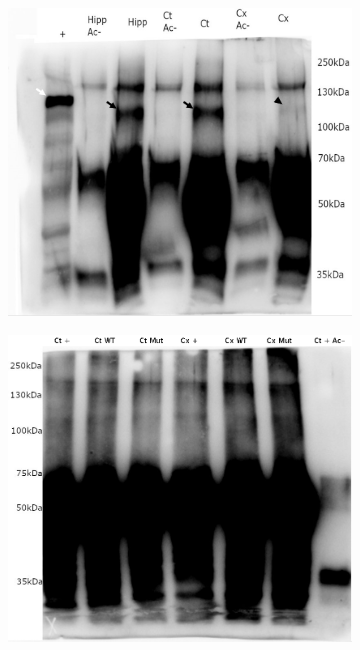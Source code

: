 	\begin{figure}[h]
		\begin{center}
			\begin{subfigure}[h]{0.49\textwidth}
				\caption{}
				\label{fig:WBbon}
				\includegraphics[width=\textwidth]{./Images/WB/2018-04-09.jpg}
			\end{subfigure}
			\begin{subfigure}[h]{0.49\textwidth}
				\caption{}
				\label{fig:WBpasbon}
				\includegraphics[width=\textwidth]{./Images/WB/2018-05-03.jpg}

\end{subfigure}
\end{center}
\end{figure}
